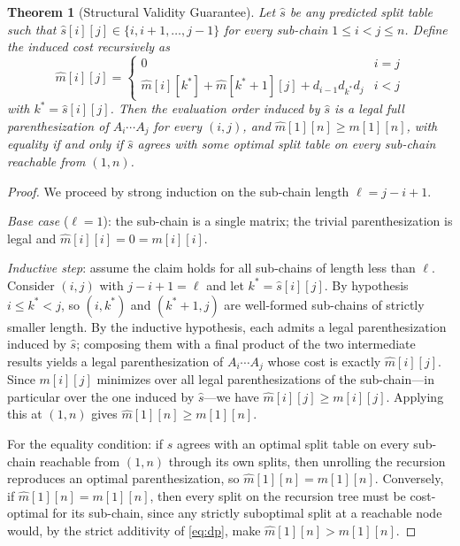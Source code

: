 \documentclass[conference]{IEEEtran}
\newtheorem{theorem}{Theorem}
\begin{document}
\begin{theorem}[Structural Validity Guarantee]
\label{thm:validity}
Let $\hat{s}$ be any predicted split table such that
$\hat{s}[i][j] \in \{i, i{+}1, \ldots, j{-}1\}$ for every sub-chain
$1 \le i < j \le n$. Define the induced cost recursively as
\begin{equation}
\hat{m}[i][j] =
\begin{cases}
0 & i = j\\
\hat{m}[i][k^\ast] + \hat{m}[k^\ast{+}1][j] + d_{i-1} d_{k^\ast} d_j & i < j
\end{cases}
\end{equation}
with $k^\ast = \hat{s}[i][j]$. Then the evaluation order induced by $\hat{s}$
is a legal full parenthesization of $A_i \cdots A_j$ for every $(i,j)$, and
$\hat{m}[1][n] \ge m[1][n]$, with equality if and only if $\hat{s}$ agrees with
some optimal split table on every sub-chain reachable from $(1,n)$.
\end{theorem}

\begin{proof}
We proceed by strong induction on the sub-chain length $\ell = j - i + 1$.

\emph{Base case} ($\ell = 1$): the sub-chain is a single matrix; the trivial
parenthesization is legal and $\hat{m}[i][i] = 0 = m[i][i]$.

\emph{Inductive step}: assume the claim holds for all sub-chains of length less
than $\ell$. Consider $(i,j)$ with $j - i + 1 = \ell$ and let
$k^\ast = \hat{s}[i][j]$. By hypothesis $i \le k^\ast < j$, so $(i, k^\ast)$
and $(k^\ast{+}1, j)$ are well-formed sub-chains of strictly smaller length.
By the inductive hypothesis, each admits a legal parenthesization induced by
$\hat{s}$; composing them with a final product of the two intermediate results
yields a legal parenthesization of $A_i \cdots A_j$ whose cost is exactly
$\hat{m}[i][j]$. Since $m[i][j]$ minimizes over all legal parenthesizations of
the sub-chain---in particular over the one induced by $\hat{s}$---we have
$\hat{m}[i][j] \ge m[i][j]$. Applying this at $(1,n)$ gives
$\hat{m}[1][n] \ge m[1][n]$.

For the equality condition: if $\hat{s}$ agrees with an optimal split table on
every sub-chain reachable from $(1,n)$ through its own splits, then unrolling
the recursion reproduces an optimal parenthesization, so
$\hat{m}[1][n] = m[1][n]$. Conversely, if $\hat{m}[1][n] = m[1][n]$, then every
split on the recursion tree must be cost-optimal for its sub-chain, since any
strictly suboptimal split at a reachable node would, by the strict additivity
of \eqref{eq:dp}, make $\hat{m}[1][n] > m[1][n]$.
\end{proof}
\end{document}
